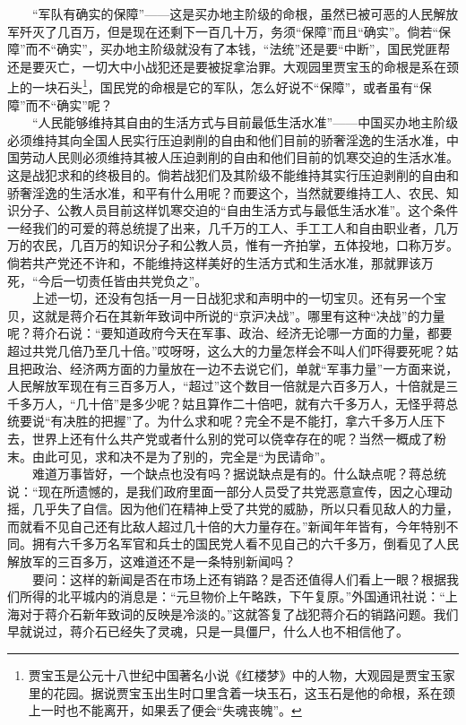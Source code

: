 \documentclass[cn,11pt,chinese]{elegantbook}
\begin{document}
　　“军队有确实的保障”——这是买办地主阶级的命根，虽然已被可恶的人民解放军歼灭了几百万，但是现在还剩下一百几十万，务须“保障”而且“确实”。倘若“保障”而不“确实”，买办地主阶级就没有了本钱，“法统”还是要“中断”，国民党匪帮还是要灭亡，一切大中小战犯还是要被捉拿治罪。大观园里贾宝玉的命根是系在颈上的一块石头\footnote[4]{ 贾宝玉是公元十八世纪中国著名小说《红楼梦》中的人物，大观园是贾宝玉家里的花园。据说贾宝玉出生时口里含着一块玉石，这玉石是他的命根，系在颈上一时也不能离开，如果丢了便会“失魂丧魄”。}，国民党的命根是它的军队，怎么好说不“保障”，或者虽有“保障”而不“确实”呢？\\
　　“人民能够维持其自由的生活方式与目前最低生活水准”——中国买办地主阶级必须维持其向全国人民实行压迫剥削的自由和他们目前的骄奢淫逸的生活水准，中国劳动人民则必须维持其被人压迫剥削的自由和他们目前的饥寒交迫的生活水准。这是战犯求和的终极目的。倘若战犯们及其阶级不能维持其实行压迫剥削的自由和骄奢淫逸的生活水准，和平有什么用呢？而要这个，当然就要维持工人、农民、知识分子、公教人员目前这样饥寒交迫的“自由生活方式与最低生活水准”。这个条件一经我们的可爱的蒋总统提了出来，几千万的工人、手工工人和自由职业者，几万万的农民，几百万的知识分子和公教人员，惟有一齐拍掌，五体投地，口称万岁。倘若共产党还不许和，不能维持这样美好的生活方式和生活水准，那就罪该万死，“今后一切责任皆由共党负之”。\\
　　上述一切，还没有包括一月一日战犯求和声明中的一切宝贝。还有另一个宝贝，这就是蒋介石在其新年致词中所说的“京沪决战”。哪里有这种“决战”的力量呢？蒋介石说：“要知道政府今天在军事、政治、经济无论哪一方面的力量，都要超过共党几倍乃至几十倍。”哎呀呀，这么大的力量怎样会不叫人们吓得要死呢？姑且把政治、经济两方面的力量放在一边不去说它们，单就“军事力量”一方面来说，人民解放军现在有三百多万人，“超过”这个数目一倍就是六百多万人，十倍就是三千多万人，“几十倍”是多少呢？姑且算作二十倍吧，就有六千多万人，无怪乎蒋总统要说“有决胜的把握”了。为什么求和呢？完全不是不能打，拿六千多万人压下去，世界上还有什么共产党或者什么别的党可以侥幸存在的呢？当然一概成了粉末。由此可见，求和决不是为了别的，完全是“为民请命”。\\
　　难道万事皆好，一个缺点也没有吗？据说缺点是有的。什么缺点呢？蒋总统说：“现在所遗憾的，是我们政府里面一部分人员受了共党恶意宣传，因之心理动摇，几乎失了自信。因为他们在精神上受了共党的威胁，所以只看见敌人的力量，而就看不见自己还有比敌人超过几十倍的大力量存在。”新闻年年皆有，今年特别不同。拥有六千多万名军官和兵士的国民党人看不见自己的六千多万，倒看见了人民解放军的三百多万，这难道还不是一条特别新闻吗？\\
　　要问：这样的新闻是否在市场上还有销路？是否还值得人们看上一眼？根据我们所得的北平城内的消息是：“元旦物价上午略跌，下午复原。”外国通讯社说：“上海对于蒋介石新年致词的反映是冷淡的。”这就答复了战犯蒋介石的销路问题。我们早就说过，蒋介石已经失了灵魂，只是一具僵尸，什么人也不相信他了。\\
\end{document}
